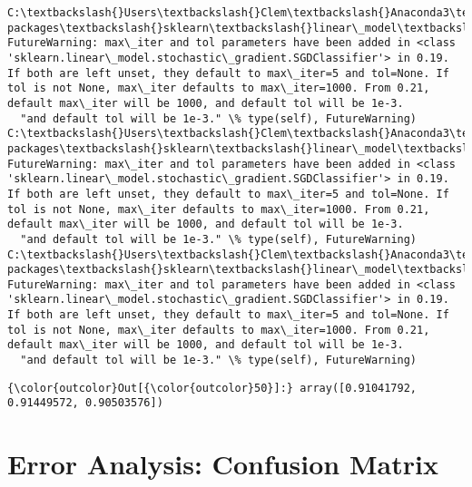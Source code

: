 \documentclass[11pt]{article}
\begin{document}
    \begin{Verbatim}[commandchars=\\\{\}]
C:\textbackslash{}Users\textbackslash{}Clem\textbackslash{}Anaconda3\textbackslash{}lib\textbackslash{}site-packages\textbackslash{}sklearn\textbackslash{}linear\_model\textbackslash{}stochastic\_gradient.py:128: FutureWarning: max\_iter and tol parameters have been added in <class 'sklearn.linear\_model.stochastic\_gradient.SGDClassifier'> in 0.19. If both are left unset, they default to max\_iter=5 and tol=None. If tol is not None, max\_iter defaults to max\_iter=1000. From 0.21, default max\_iter will be 1000, and default tol will be 1e-3.
  "and default tol will be 1e-3." \% type(self), FutureWarning)
C:\textbackslash{}Users\textbackslash{}Clem\textbackslash{}Anaconda3\textbackslash{}lib\textbackslash{}site-packages\textbackslash{}sklearn\textbackslash{}linear\_model\textbackslash{}stochastic\_gradient.py:128: FutureWarning: max\_iter and tol parameters have been added in <class 'sklearn.linear\_model.stochastic\_gradient.SGDClassifier'> in 0.19. If both are left unset, they default to max\_iter=5 and tol=None. If tol is not None, max\_iter defaults to max\_iter=1000. From 0.21, default max\_iter will be 1000, and default tol will be 1e-3.
  "and default tol will be 1e-3." \% type(self), FutureWarning)
C:\textbackslash{}Users\textbackslash{}Clem\textbackslash{}Anaconda3\textbackslash{}lib\textbackslash{}site-packages\textbackslash{}sklearn\textbackslash{}linear\_model\textbackslash{}stochastic\_gradient.py:128: FutureWarning: max\_iter and tol parameters have been added in <class 'sklearn.linear\_model.stochastic\_gradient.SGDClassifier'> in 0.19. If both are left unset, they default to max\_iter=5 and tol=None. If tol is not None, max\_iter defaults to max\_iter=1000. From 0.21, default max\_iter will be 1000, and default tol will be 1e-3.
  "and default tol will be 1e-3." \% type(self), FutureWarning)

    \end{Verbatim}

\begin{Verbatim}[commandchars=\\\{\}]
{\color{outcolor}Out[{\color{outcolor}50}]:} array([0.91041792, 0.91449572, 0.90503576])
\end{Verbatim}
            
    \section{Error Analysis: Confusion
Matrix}\label{error-analysis-confusion-matrix}
\end{document}
